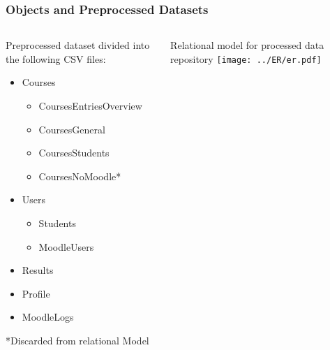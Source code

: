 \begin{frame}
\frametitle{Objects and Preprocessed Datasets}

\begin{columns}[T] %
\begin{column}{.48\textwidth}
    Preprocessed dataset divided into the following CSV files:

    \begin{itemize}
        \item Courses

            \begin{itemize}
                \item CoursesEntriesOverview
                \item CoursesGeneral
                \item CoursesStudents
                \item \color{gray} CoursesNoMoodle*
            \end{itemize}

        \item Users

            \begin{itemize}
                \item Students
                \item MoodleUsers
            \end{itemize}

        \item Results
        \item Profile
        \item MoodleLogs
    \end{itemize}

    \tiny{*Discarded from relational Model}
\end{column}%
\hfill%
\begin{column}{.48\textwidth}
    Relational model for processed data repository
    \texttt{[image: ../ER/er.pdf]}
\end{column}%
\end{columns}
\end{frame}
